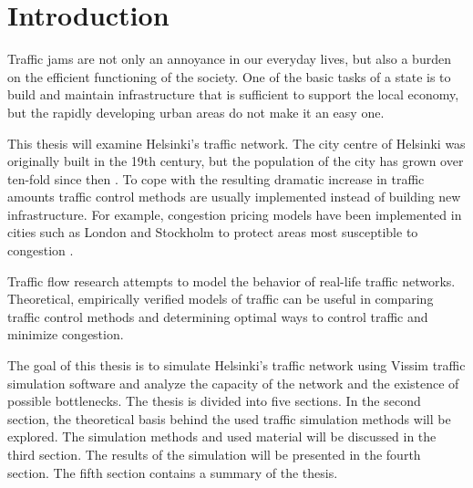 \documentclass[english, 12pt, a4paper, elec, utf8, pdfa, online]{aaltothesis}
\begin{document}

\cleardoublepage

\section{Introduction}

\thispagestyle{empty}

Traffic jams are not only an annoyance in our everyday lives, but also a burden on the efficient functioning of the society. One of the basic tasks of a state is to build and maintain infrastructure that is sufficient to support the local economy, but the rapidly developing urban areas do not make it an easy one.

This thesis will examine Helsinki's traffic network. The city centre of Helsinki was originally built in the 19th century, but the population of the city has grown over ten-fold since then \cite{helsinki}. To cope with the resulting dramatic increase in traffic amounts traffic control methods are usually implemented instead of building new infrastructure. For example, congestion pricing models have been implemented in cities such as London and Stockholm to protect areas most susceptible to congestion \cite{congestionpricing}.

Traffic flow research attempts to model the behavior of real-life traffic networks. Theoretical, empirically verified models of traffic can be useful in comparing traffic control methods and determining optimal ways to control traffic and minimize congestion.

The goal of this thesis is to simulate Helsinki's traffic network using Vissim traffic simulation software and analyze the capacity of the network and the existence of possible bottlenecks. The thesis is divided into five sections. In the second section, the theoretical basis behind the used traffic simulation methods will be explored. The simulation methods and used material will be discussed in the third section. The results of the simulation will be presented in the fourth section. The fifth section contains a summary of the thesis.
\end{document}

